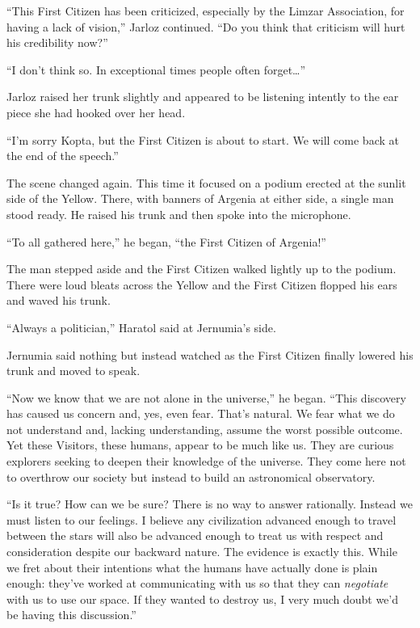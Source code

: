 ``This First Citizen has been criticized, especially by the Limzar Association, for having a
lack of vision,'' Jarloz continued. ``Do you think that criticism will hurt his credibility
now?''

``I don't think so. In exceptional times people often forget\ldots''

Jarloz raised her trunk slightly and appeared to be listening intently to the ear piece she had
hooked over her head.

``I'm sorry Kopta, but the First Citizen is about to start. We will come back at the end of the
speech.''

The scene changed again. This time it focused on a podium erected at the sunlit side of the
Yellow. There, with banners of Argenia at either side, a single man stood ready. He raised his
trunk and then spoke into the microphone.

``To all gathered here,'' he began, ``the First Citizen of Argenia!''

The man stepped aside and the First Citizen walked lightly up to the podium. There were loud
bleats across the Yellow and the First Citizen flopped his ears and waved his trunk.

``Always a politician,'' Haratol said at Jernumia's side.

Jernumia said nothing but instead watched as the First Citizen finally lowered his trunk and
moved to speak.

``Now we know that we are not alone in the universe,'' he began. ``This discovery has caused us
concern and, yes, even fear. That's natural. We fear what we do not understand and, lacking
understanding, assume the worst possible outcome. Yet these Visitors, these humans, appear to be
much like us. They are curious explorers seeking to deepen their knowledge of the universe. They
come here not to overthrow our society but instead to build an astronomical observatory.

``Is it true? How can we be sure? There is no way to answer rationally. Instead we must listen
to our feelings. I believe any civilization advanced enough to travel between the stars will
also be advanced enough to treat us with respect and consideration despite our backward nature.
The evidence is exactly this. While we fret about their intentions what the humans have actually
done is plain enough: they've worked at communicating with us so that they can \emph{negotiate}
with us to use our space. If they wanted to destroy us, I very much doubt we'd be having this
discussion.''

